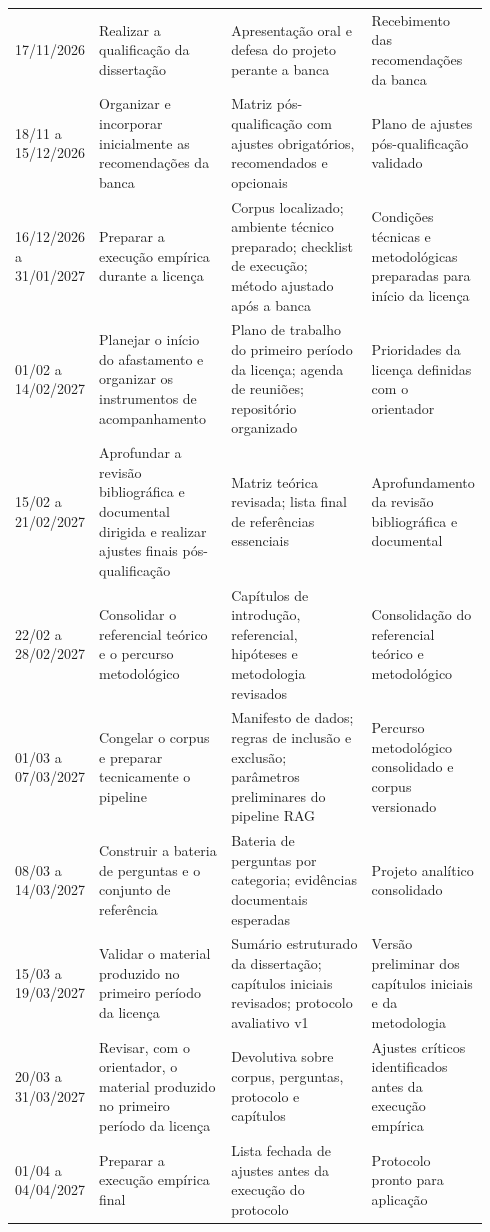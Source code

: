 \begin{landscape}
\begin{longtable}{p{0.12\linewidth}p{0.28\linewidth}p{0.30\linewidth}p{0.24\linewidth}}
17/11/2026 & Realizar a qualificação da dissertação & Apresentação oral e defesa do projeto perante a banca & Recebimento das recomendações da banca \\
18/11 a 15/12/2026 & Organizar e incorporar inicialmente as recomendações da banca & Matriz pós-qualificação com ajustes obrigatórios, recomendados e opcionais & Plano de ajustes pós-qualificação validado \\
16/12/2026 a 31/01/2027 & Preparar a execução empírica durante a licença & Corpus localizado; ambiente técnico preparado; checklist de execução; método ajustado após a banca & Condições técnicas e metodológicas preparadas para início da licença \\
01/02 a 14/02/2027 & Planejar o início do afastamento e organizar os instrumentos de acompanhamento & Plano de trabalho do primeiro período da licença; agenda de reuniões; repositório organizado & Prioridades da licença definidas com o orientador \\
15/02 a 21/02/2027 & Aprofundar a revisão bibliográfica e documental dirigida e realizar ajustes finais pós-qualificação & Matriz teórica revisada; lista final de referências essenciais & Aprofundamento da revisão bibliográfica e documental \\
22/02 a 28/02/2027 & Consolidar o referencial teórico e o percurso metodológico & Capítulos de introdução, referencial, hipóteses e metodologia revisados & Consolidação do referencial teórico e metodológico \\
01/03 a 07/03/2027 & Congelar o corpus e preparar tecnicamente o pipeline & Manifesto de dados; regras de inclusão e exclusão; parâmetros preliminares do pipeline RAG & Percurso metodológico consolidado e corpus versionado \\
08/03 a 14/03/2027 & Construir a bateria de perguntas e o conjunto de referência & Bateria de perguntas por categoria; evidências documentais esperadas & Projeto analítico consolidado \\
15/03 a 19/03/2027 & Validar o material produzido no primeiro período da licença & Sumário estruturado da dissertação; capítulos iniciais revisados; protocolo avaliativo v1 & Versão preliminar dos capítulos iniciais e da metodologia \\
20/03 a 31/03/2027 & Revisar, com o orientador, o material produzido no primeiro período da licença & Devolutiva sobre corpus, perguntas, protocolo e capítulos & Ajustes críticos identificados antes da execução empírica \\
01/04 a 04/04/2027 & Preparar a execução empírica final & Lista fechada de ajustes antes da execução do protocolo & Protocolo pronto para aplicação \\

\end{longtable}
\end{landscape}
